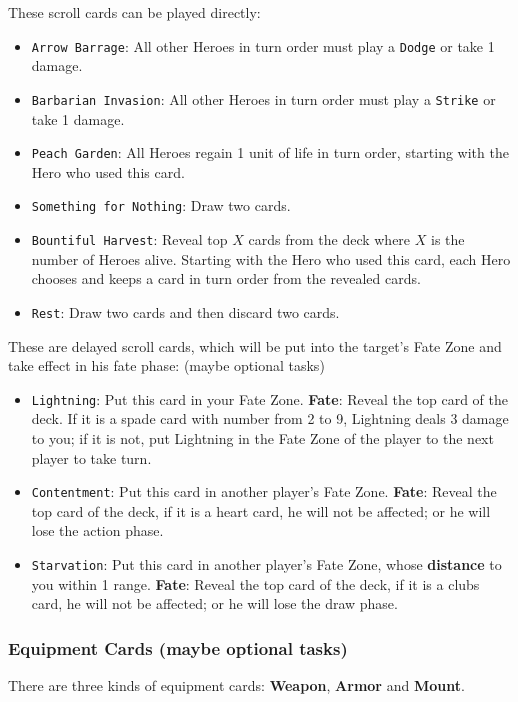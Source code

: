 \documentclass[11pt,a4paper]{article}
\begin{document}
These scroll cards can be played directly:
\begin{itemize}
\item \texttt{Arrow Barrage}: All other Heroes in turn order must play a \texttt{Dodge} or take 1 damage.
\item \texttt{Barbarian Invasion}: All other Heroes in turn order must play a \texttt{Strike} or take 1 damage.
\item \texttt{Peach Garden}: All Heroes regain 1 unit of life in turn order, starting with the Hero who used this card.
\item \texttt{Something for Nothing}: Draw two cards.
\item \texttt{Bountiful Harvest}: Reveal top $X$ cards from the deck where $X$ is the number of Heroes alive. Starting with the Hero who used this card, each Hero chooses and keeps a card in turn order from the revealed cards.
\item \texttt{Rest}: Draw two cards and then discard two cards.
\end{itemize} 

These are delayed scroll cards, which will be put into the target's Fate Zone and take effect in his fate phase: (maybe optional tasks)
\begin{itemize}
\item \texttt{Lightning}: Put this card in your Fate Zone. \textbf{Fate}: Reveal the top card of the deck. If it is a spade card with number from 2 to 9, Lightning deals 3 damage to you; if it is not, put Lightning in the Fate Zone of the player to the next player to take turn.
\item \texttt{Contentment}: Put this card in another player's Fate Zone. \textbf{Fate}: Reveal the top card of the deck, if it is a heart card, he will not be affected; or he will lose the action phase.
\item \texttt{Starvation}: Put this card in another player's Fate Zone, whose \textbf{distance} to you within 1 range. \textbf{Fate}: Reveal the top card of the deck, if it is a clubs card, he will not be affected; or he will lose the draw phase.
\end{itemize}

\subsubsection{Equipment Cards (maybe optional tasks)}
There are three kinds of equipment cards: \textbf{Weapon}, \textbf{Armor} and \textbf{Mount}. \bigskip
\end{document}
